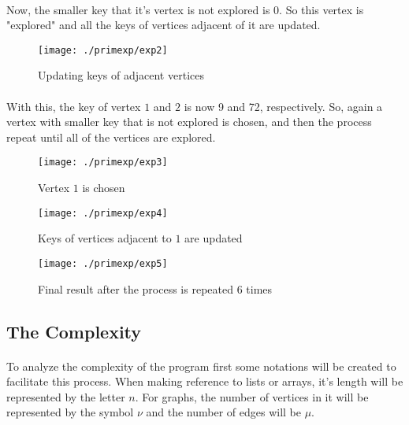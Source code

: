 \documentclass[titlepage]{article}
\begin{document}
        \paragraph{}
        Now, the smaller key that it's vertex is not explored is 0. So this vertex is "explored" and all the keys of vertices adjacent of it are updated.
        \begin{figure}[h]
            \begin{center}
                \texttt{[image: ./primexp/exp2]}
                \caption{Updating keys of adjacent vertices}
            \end{center}
        \end{figure}
        \paragraph{}
        With this, the key of vertex $1$ and $2$ is now 9 and 72, respectively. So, again a vertex with smaller key that is not explored is chosen, and then the process repeat until all of the vertices are explored.
        \begin{figure}[h]
            \begin{center}
                \texttt{[image: ./primexp/exp3]}
                \caption{Vertex $1$ is chosen}
            \end{center}
        \end{figure}
        \begin{figure}[h]
            \begin{center}
                \texttt{[image: ./primexp/exp4]}
                \caption{Keys of vertices adjacent to $1$ are updated}
            \end{center}
        \end{figure}
        \begin{figure}[h!]
            \begin{center}
                \texttt{[image: ./primexp/exp5]}
                \caption{Final result after the process is repeated 6 times}
            \end{center}
        \end{figure}
        \subsection{The Complexity}
        \paragraph{}
        To analyze the complexity of the program first some notations will be created to facilitate this process. When making reference to lists or arrays, it's length will be represented by the letter $n$. For graphs, the number of vertices in it will be represented by the symbol $\nu$ and the number of edges will be $\mu$.
\end{document}
